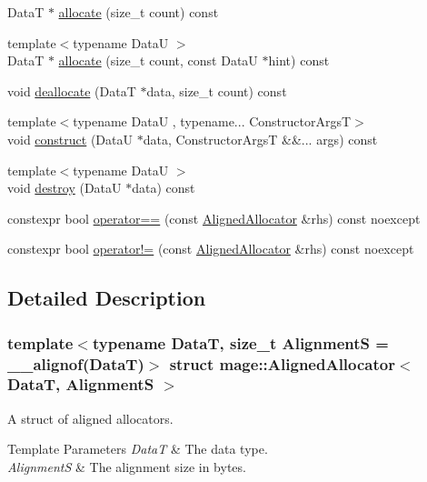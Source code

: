 \begin{DoxyCompactItemize}
\item 
DataT $\ast$ \hyperlink{structmage_1_1_aligned_allocator_aa40b7eb431ac79e6b09bbd9e55906e78}{allocate} (size\+\_\+t count) const
\item 
{\footnotesize template$<$typename DataU $>$ }\\DataT $\ast$ \hyperlink{structmage_1_1_aligned_allocator_ae7369bc87b8720a0433f8ceda2a52218}{allocate} (size\+\_\+t count, const DataU $\ast$hint) const
\item 
void \hyperlink{structmage_1_1_aligned_allocator_a7893ac09903ab7c8601e9db45715c5d7}{deallocate} (DataT $\ast$data, size\+\_\+t count) const
\item 
{\footnotesize template$<$typename DataU , typename... Constructor\+ArgsT$>$ }\\void \hyperlink{structmage_1_1_aligned_allocator_a1dab96378ee44579508c6722b9f6164c}{construct} (DataU $\ast$data, Constructor\+ArgsT \&\&... args) const
\item 
{\footnotesize template$<$typename DataU $>$ }\\void \hyperlink{structmage_1_1_aligned_allocator_a5334e1389c6018a91fdfe2db592d2b74}{destroy} (DataU $\ast$data) const
\item 
constexpr bool \hyperlink{structmage_1_1_aligned_allocator_a965e61e026392438052824c70ddd7d81}{operator==} (const \hyperlink{structmage_1_1_aligned_allocator}{Aligned\+Allocator} \&rhs) const noexcept
\item 
constexpr bool \hyperlink{structmage_1_1_aligned_allocator_ad5441594e288932744eb3d2528fc3ac7}{operator!=} (const \hyperlink{structmage_1_1_aligned_allocator}{Aligned\+Allocator} \&rhs) const noexcept
\end{DoxyCompactItemize}


\subsection{Detailed Description}
\subsubsection*{template$<$typename DataT, size\+\_\+t AlignmentS = \+\_\+\+\_\+alignof(\+Data\+T)$>$\newline
struct mage\+::\+Aligned\+Allocator$<$ Data\+T, Alignment\+S $>$}

A struct of aligned allocators.


\begin{DoxyTemplParams}{Template Parameters}
{\em DataT} & The data type. \\
\hline
{\em AlignmentS} & The alignment size in bytes. \\
\hline
\end{DoxyTemplParams}


